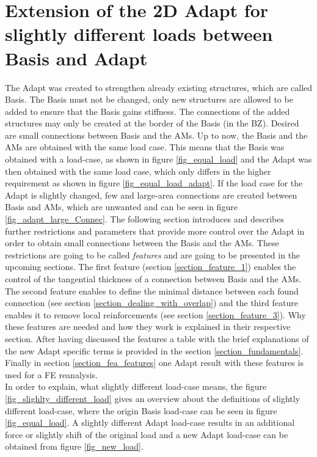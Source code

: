 \chapter{Extension of the 2D Adapt for slightly different loads between Basis and Adapt}
\label{chapter_features_adapt}
 The Adapt was created to strengthen already existing structures, which are called Basis. 
 The Basis must not be changed, only new structures are allowed to be added to ensure  that the Basis gains stiffness.
 The connections of the added structures may 
 only be created at the border of the Basis (in the BZ).  
 Desired are small connections between Basis and the AMs.
  Up to now, the Basis and the AMs are obtained with the same load case.
  This means that the Basis was obtained with a load-case, as shown in
  figure \ref{fig_equal_load} and the Adapt was then
  obtained with the same load case, which only differs in the higher
  requirement as shown in figure
  \ref{fig_equal_load_adapt}.
  If the load case for the Adapt is slightly changed,
  few and large-area connections are created between Basis
   and AMs, which are unwanted and can be
   seen in figure 
   \ref{fig_adapt_large_Connec}.
   The following section introduces and describes further restrictions and parameters 
   that provide more control over the Adapt in
    order to obtain small connections between the Basis and the AMs.
    These restrictions are going to be called \emph{features} and are going to
    be presented in the upcoming sections. The first feature
    (section \ref{section_feature_1})
    enables the control of the tangential thickness of
    a connection between Basis and the AMs.
    The second feature enables to define
    the minimal distance between each found
    connection
    (see section \ref{section_dealing_with_overlap})
    and the third feature enables it
    to remove local reinforcements
    (see section \ref{section_feature_3}).
    Why these features are
    needed and how they work is explained in their
    respective section. After having discussed the features
    a table with the brief explanations of
    the new Adapt specific terms is provided in
    the section
    \ref{section_fundamentals}.
    Finally in
    section \ref{section_fea_features} one
     Adapt result with these features is
    used for a FE reanalysis.\\
    
     In order to explain, what slightly
     different load-case means,
    the figure \ref{fig_slighlty_different_load} 
    gives an overview about the definitions of slightly different load-case,
    where the origin Basis load-case
    can be seen in figure \ref{fig_equal_load}.
    A slightly different Adapt load-case results in an additional force or
    slightly shift of the original load and a new Adapt load-case can
    be obtained from figure \ref{fig_new_load}.

